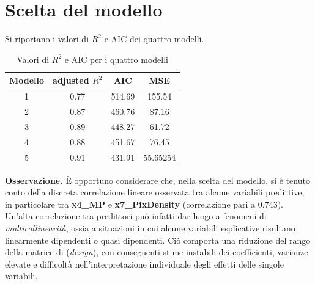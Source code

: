 \section{Scelta del modello}
Si riportano i valori di $R^2$ e AIC dei quattro modelli.
\begin{table}[H]
	\centering
	\begin{tabular}{|c|c|c|c|}
		\hline
		\textbf{Modello} & \textbf{adjusted} \boldmath$R^2$ & \textbf{AIC} & \textbf{MSE}\\
		\hline
		1 &  0.77  & 514.69 & 155.54\\
		2 & 0.87 & 460.76 & 87.16\\
		3 & 0.89 & 448.27 & 61.72\\
		4 & 0.88 & 451.67 & 76.45\\
		5 & 0.91 & 431.91 & 55.65254 \\
		\hline
	\end{tabular}
	\caption{Valori di $R^2$ e AIC per i quattro modelli}
\end{table}
\textbf{Osservazione.} È opportuno considerare che, nella scelta del modello, si è tenuto conto della discreta correlazione lineare osservata tra alcune variabili predittive, in particolare tra \textbf{x4\_MP} e \textbf{x7\_PixDensity} (correlazione pari a 0.743). \\ 
   Un’alta correlazione tra predittori può infatti dar luogo a fenomeni di \emph{multicollinearità}, ossia a situazioni in cui alcune variabili esplicative risultano linearmente dipendenti o quasi dipendenti. Ciò comporta una riduzione del rango della matrice di (\emph{design}), con conseguenti stime instabili dei coefficienti, varianze elevate e difficoltà nell’interpretazione individuale degli effetti delle singole variabili.
   
